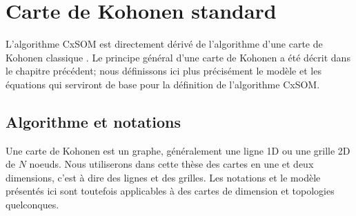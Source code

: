 \section{Carte de Kohonen standard}\label{sec:kohonen}
L'algorithme CxSOM est directement dérivé de l'algorithme d'une carte de Kohonen classique \cite{kohonen92}. Le principe général d'une carte de Kohonen a été décrit dans le chapitre précédent; nous définissons ici plus précisément le modèle et les équations qui serviront de base pour la définition de l'algorithme CxSOM.
\subsection{Algorithme et notations}
Une carte de Kohonen est un graphe, généralement une ligne 1D ou une grille 2D de $N$ noeuds. Nous utiliserons dans cette thèse des cartes en une et deux dimensions, c'est à dire des lignes et des grilles. Les notations et le modèle présentés ici sont toutefois applicables à des cartes de dimension et topologies quelconques.

